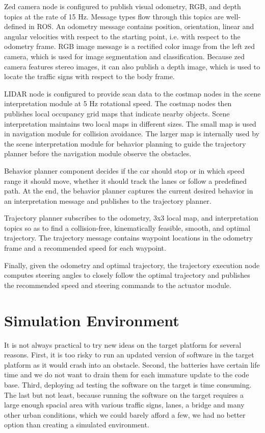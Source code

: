 Zed camera node is configured to publish visual odometry, RGB, and depth topics
at the rate of 15 Hz. Message types flow through this topics are well-defined
in ROS. An odometry message contains position, orientation, linear and angular
velocities with respect to the starting point, i.e. with respect to the
odometry frame. RGB image message is a rectified color image from the left zed
camera, which is used for image segmentation and classification. Because zed
camera features stereo images, it can also publish a depth image, which is used
to locate the traffic signs with respect to the body frame.

LIDAR node is configured to provide scan data to the costmap nodes in the scene
interpretation module at 5 Hz rotational speed. The costmap nodes then
publishes local occupancy grid maps that indicate nearby objects. Scene
interpretation maintains two local maps in different sizes. The small map is
used in navigation module for collision avoidance.  The larger map is
internally used by the scene interpretation module for behavior planning to
guide the trajectory planner before the navigation module observe the
obstacles.

Behavior planner component decides if the car should stop or in which speed
range it should move, whether it should track the lanes or follow a predefined
path. At the end, the behavior planner captures the current desired
behavior in an interpretation message and publishes to the trajectory planner.

Trajectory planner subscribes to the odometry, 3x3 local map, and
interpretation topics so as to find a collision-free, kinematically feasible,
smooth, and optimal trajectory. The trajectory message contains waypoint
locations in the odometry frame and a recommended speed for each waypoint.

Finally, given the odometry and optimal trajectory, the trajectory execution
node computes steering angles to closely follow the optimal trajectory and
publishes the recommended speed and steering commands to the actuator module.

\section{Simulation Environment}

It is not always practical to try new ideas on the target platform for several
reasons. First, it is too risky to run an updated version of software in the
target platform as it would crash into an obstacle. Second, the batteries have
certain life time and we do not want to drain them for each immature update to
the code base. Third, deploying ad testing the software on the target is time
consuming. The last but not least, because running the software on the target
requires a large enough spacial area with various traffic signs, lanes, a
bridge and many other urban conditions, which we could barely afford a few, we
had no better option than creating a simulated environment.

